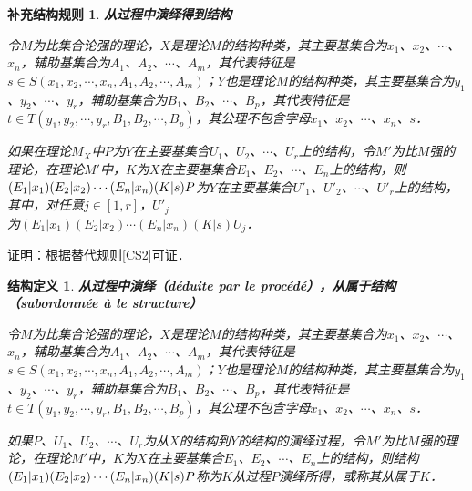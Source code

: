 \documentclass[12pt, a4paper, oneside]{book}
\newtheorem{STdef}{结构定义}
\newtheorem{CSTcor}{补充结构规则}
\begin{document}
			\begin{CSTcor}\label{CSTcor8}
				\textbf{从过程中演绎得到结构}
				\par
				令$M$为比集合论强的理论，$X$是理论$M$的结构种类，其主要基集合为$x_1$、$x_2$、$\cdots$、$x_n$，辅助基集合为$A_1$、$A_2$、$\cdots$、$A_m$，其代表特征是$s\in S(x_1, x_2, \cdots, x_n, A_1, A_2, \cdots, A_m)$；$Y$也是理论$M$的结构种类，其主要基集合为$y_1$、$y_2$、$\cdots$、$y_r$，辅助基集合为$B_1$、$B_2$、$\cdots$、$B_p$，其代表特征是$t\in T(y_1, y_2, \cdots, y_r, B_1, B_2, \cdots, B_p)$，其公理不包含字母$x_1$、$x_2$、$\cdots$、$x_n$、$s$．
				\par
				如果在理论$M_X$中$P$为$Y$在主要基集合$U_1$、$U_2$、$\cdots$、$U_r$上的结构，令$M'$为比$M$强的理论，在理论$M'$中，$K$为$X$在主要基集合$E_1$、$E_2$、$\cdots$、$E_n$上的结构，则$(E_1|x_1)(E_2|x_2)\cdots\\(E_n|x_n)(K|s)P$为$Y$在主要基集合${U'}_1$、${U'}_2$、$\cdots$、${U'}_r$上的结构，其中，对任意$j\in [1, r]$，${U'}_j$\\为$(E_1|x_1)(E_2|x_2)\cdots(E_n|x_n)(K|s)U_j$．
			\end{CSTcor}
			证明：根据替代规则\ref{CS2}可证．
						
			\begin{STdef}
				\textbf{从过程中演绎（déduite par le procédé），从属于结构（subordonnée à le structure）}
				\par
				令$M$为比集合论强的理论，$X$是理论$M$的结构种类，其主要基集合为$x_1$、$x_2$、$\cdots$、$x_n$，辅助基集合为$A_1$、$A_2$、$\cdots$、$A_m$，其代表特征是$s\in S(x_1, x_2, \cdots, x_n, A_1, A_2, \cdots, A_m)$；$Y$也是理论$M$的结构种类，其主要基集合为$y_1$、$y_2$、$\cdots$、$y_r$，辅助基集合为$B_1$、$B_2$、$\cdots$、$B_p$，其代表特征是$t\in T(y_1, y_2, \cdots, y_r, B_1, B_2, \cdots, B_p)$，其公理不包含字母$x_1$、$x_2$、$\cdots$、$x_n$、$s$．
				\par
				如果$P$、$U_1$、$U_2$、$\cdots$、$U_r$为从$X$的结构到$Y$的结构的演绎过程，令$M'$为比$M$强的理论，在理论$M'$中，$K$为$X$在主要基集合$E_1$、$E_2$、$\cdots$、$E_n$上的结构，则结构$(E_1|x_1)(E_2|x_2)\\\cdots(E_n|x_n)(K|s)P$称为$K$从过程$P$演绎所得，或称其从属于$K$．
			\end{STdef}
			
\end{document}
